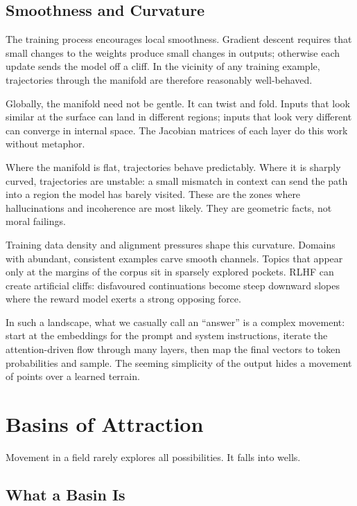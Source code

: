 \documentclass[12pt,a4paper]{article}
\begin{document}
\subsection{Smoothness and Curvature}

The training process encourages local smoothness. Gradient descent requires that small changes to the weights produce small changes in outputs; otherwise each update sends the model off a cliff. In the vicinity of any training example, trajectories through the manifold are therefore reasonably well-behaved.

Globally, the manifold need not be gentle. It can twist and fold. Inputs that look similar at the surface can land in different regions; inputs that look very different can converge in internal space. The Jacobian matrices of each layer do this work without metaphor.

Where the manifold is flat, trajectories behave predictably. Where it is sharply curved, trajectories are unstable: a small mismatch in context can send the path into a region the model has barely visited. These are the zones where hallucinations and incoherence are most likely. They are geometric facts, not moral failings.

Training data density and alignment pressures shape this curvature. Domains with abundant, consistent examples carve smooth channels. Topics that appear only at the margins of the corpus sit in sparsely explored pockets. RLHF can create artificial cliffs: disfavoured continuations become steep downward slopes where the reward model exerts a strong opposing force.

In such a landscape, what we casually call an ``answer'' is a complex movement: start at the embeddings for the prompt and system instructions, iterate the attention-driven flow through many layers, then map the final vectors to token probabilities and sample. The seeming simplicity of the output hides a movement of points over a learned terrain.

\section{Basins of Attraction}

Movement in a field rarely explores all possibilities. It falls into wells.

\subsection{What a Basin Is}
\end{document}
